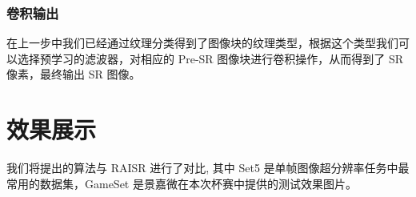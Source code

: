 \documentclass[12pt, a4paper, oneside]{ctexbook}
\begin{document}
	\subsection{卷积输出}
	在上一步中我们已经通过纹理分类得到了图像块的纹理类型，根据这个类型我们可以选择预学习的滤波器，对相应的 Pre-SR 图像块进行卷积操作，从而得到了 SR 像素，最终输出 SR 图像。
	
	\chapter{效果展示}
	我们将提出的算法与 RAISR 进行了对比,	其中 Set5 是单帧图像超分辨率任务中最常用的数据集，GameSet 是景嘉微在本次杯赛中提供的测试效果图片。
	
	\begin{figure}[h]
		\centering
		\quad
		\subfigure[bicubic]{
}
\end{figure}
\end{document}
